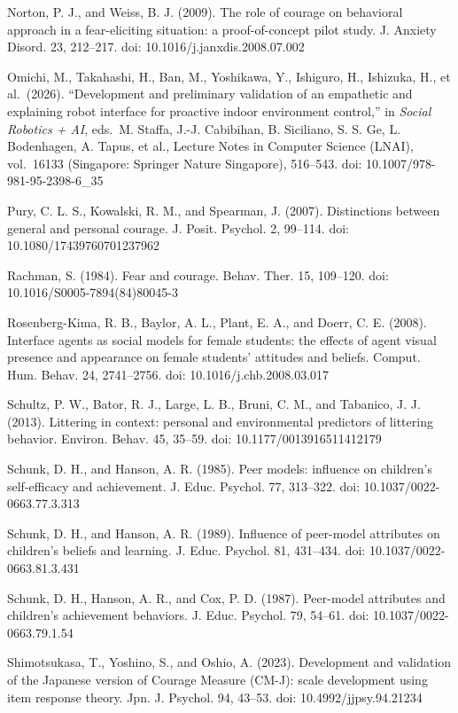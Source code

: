 \documentclass[
]{article}
\begin{document}
Norton, P. J., and Weiss, B. J. (2009). The role of courage on
behavioral approach in a fear-eliciting situation: a proof-of-concept
pilot study. J. Anxiety Disord. 23, 212--217. doi:
10.1016/j.janxdis.2008.07.002

Omichi, M., Takahashi, H., Ban, M., Yoshikawa, Y., Ishiguro, H.,
Ishizuka, H., et al.~(2026). ``Development and preliminary validation of
an empathetic and explaining robot interface for proactive indoor
environment control,'' in \emph{Social Robotics + AI}, eds.~M. Staffa,
J.-J. Cabibihan, B. Siciliano, S. S. Ge, L. Bodenhagen, A. Tapus, et
al., Lecture Notes in Computer Science (LNAI), vol.~16133 (Singapore:
Springer Nature Singapore), 516--543. doi: 10.1007/978-981-95-2398-6\_35

Pury, C. L. S., Kowalski, R. M., and Spearman, J. (2007). Distinctions
between general and personal courage. J. Posit. Psychol. 2, 99--114.
doi: 10.1080/17439760701237962

Rachman, S. (1984). Fear and courage. Behav. Ther. 15, 109--120. doi:
10.1016/S0005-7894(84)80045-3

Rosenberg-Kima, R. B., Baylor, A. L., Plant, E. A., and Doerr, C. E.
(2008). Interface agents as social models for female students: the
effects of agent visual presence and appearance on female students'
attitudes and beliefs. Comput. Hum. Behav. 24, 2741--2756. doi:
10.1016/j.chb.2008.03.017

Schultz, P. W., Bator, R. J., Large, L. B., Bruni, C. M., and Tabanico,
J. J. (2013). Littering in context: personal and environmental
predictors of littering behavior. Environ. Behav. 45, 35--59. doi:
10.1177/0013916511412179

Schunk, D. H., and Hanson, A. R. (1985). Peer models: influence on
children's self-efficacy and achievement. J. Educ. Psychol. 77,
313--322. doi: 10.1037/0022-0663.77.3.313

Schunk, D. H., and Hanson, A. R. (1989). Influence of peer-model
attributes on children's beliefs and learning. J. Educ. Psychol. 81,
431--434. doi: 10.1037/0022-0663.81.3.431

Schunk, D. H., Hanson, A. R., and Cox, P. D. (1987). Peer-model
attributes and children's achievement behaviors. J. Educ. Psychol. 79,
54--61. doi: 10.1037/0022-0663.79.1.54

Shimotsukasa, T., Yoshino, S., and Oshio, A. (2023). Development and
validation of the Japanese version of Courage Measure (CM-J): scale
development using item response theory. Jpn. J. Psychol. 94, 43--53.
doi: 10.4992/jjpsy.94.21234
\end{document}
